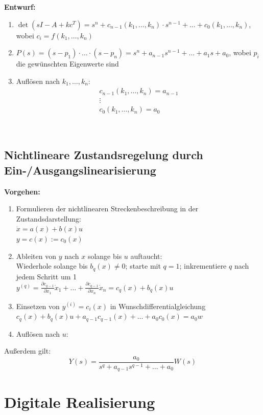 \documentclass[10pt,a4paper]{article}
\newcommand{\tab}[1][1]{\hspace*{#1cm}}
\begin{document}
\textbf{Entwurf:}
\begin{enumerate}
	\item $\det(sI - A + kc^T) = s^n + c_{n-1}(k_1, \dots, k_n) ⋅ s^{n-1} + \dots + c_0(k_1, \dots, k_n)$, \tab wobei $c_i = f(k_1, \dots, k_n)$
	\item $P(s) = (s - p_1) ⋅ \dots ⋅ (s - p_n) = s^n + a_{n-1}s^{n - 1} + \dots + a_1s + a_0$, \tab wobei $p_i$ die gewünschten Eigenwerte sind
	\item Auflösen nach $k_1, \dots, k_n$: \\
	$$\begin{array}{c}
	c_{n-1}(k_1, \dots, k_n) = a_{n-1} \\
	\vdots \\
	c_0(k_1, \dots, k_n) = a_0
	\end{array}$$
\end{enumerate} ~\\

\subsection{Nichtlineare Zustandsregelung durch Ein-/Ausgangslinearisierung}

\textbf{Vorgehen:}
\begin{enumerate}
	\item Formulieren der nichtlinearen Streckenbeschreibung in der Zustandsdarstellung: \\
	$\dot x = a(x) + b(x) u$ \\
	$y = c(x) := c_0(x)$
	\item Ableiten von $y$ nach $x$ solange bis $u$ auftaucht: \\
	Wiederhole solange bis $b_q(x) ≠ 0$; starte mit $q = 1$; inkrementiere $q$ nach jedem Schritt um 1\\
	$y^{(q)} = \frac{\partial c_{q-1}}{\partial x_1} \dot x_1 + \dots + \frac{\partial c_{q-1}}{\partial x_n} \dot x_n = c_q(x) + b_q(x) u$
	\item Einsetzen von $y^{(i)} = c_i(x)$ in Wunschdifferentialgleichung \\
	$c_q(x) + b_q(x) u + a_{q-1} c_{q-1}(x) + \dots + a_0 c_0(x) = a_0 w$
	\item Auflösen nach $u$: \\
\end{enumerate}
Außerdem gilt:
$$
	Y(s) = \frac{a_0}{s^q + a_{q-1}s^{q-1} + \dots + a_0} W(s)
$$

\section{Digitale Realisierung}
\end{document}
